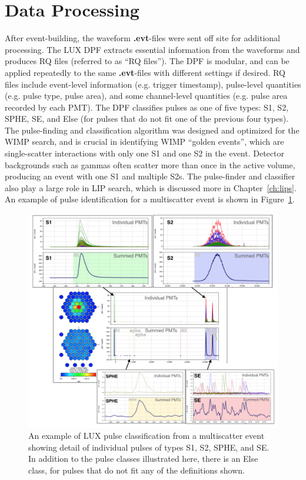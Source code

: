 \section{Data Processing}
\label{sec:lux_dpf}
After event-building, the waveform \textbf{.evt}-files were sent off site for additional processing. The \ac{LUX} \ac{DPF} extracts essential information from the waveforms and produces \ac{RQ} files (referred to as ``\ac{RQ} files''). The \ac{DPF} is modular, and can be applied repeatedly to the same \textbf{.evt}-files with different settings if desired. \ac{RQ} files include event-level information (e.g. trigger timestamp), pulse-level quantities (e.g. pulse type, pulse area), and some channel-level quantities (e.g. pulse area recorded by each \ac{PMT}). The \ac{DPF} classifies pulses as one of five types: S1, S2, \ac{SPHE}, \ac{SE}, and Else (for pulses that do not fit one of the previous four types). The pulse-finding and classification algorithm was designed and optimized for the \ac{WIMP} search, and is crucial in identifying \ac{WIMP} ``golden events'', which are single-scatter interactions with only one S1 and one S2 in the event. Detector backgrounds such as gammas often scatter more than once in the active volume, producing an event with one S1 and multiple S2s. The pulse-finder and classifier also play a large role in \ac{LIP} search, which is discussed more in Chapter~\ref{ch:lips}. An example of pulse identification for a multiscatter event is shown in Figure~\ref{fig:lux_pulses}.

\begin{figure}[htbp]
\begin{center}
\includegraphics[width=\textwidth]{figures/lux/lux_pulses.png}
\caption{An example of \acs{LUX} pulse classification from a multiscatter event showing detail of individual pulses of types S1, S2, SPHE, and SE. In addition to the pulse classes illustrated here, there is an Else class, for pulses that do not fit any of the definitions shown. }
\label{fig:lux_pulses}
\end{center}
\end{figure}


